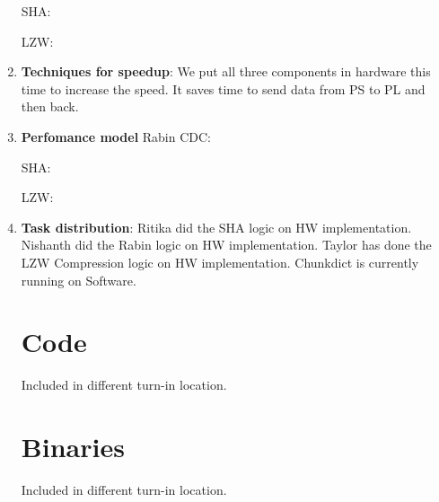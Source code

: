\documentclass{article}
\begin{document}
\begin{enumerate}
SHA:

LZW:
\newline

\item%
\textbf{Techniques for speedup}: We put all three components in hardware this time to increase the speed. It saves time to send data from PS to PL and then back. 
\newline


\item%
\textbf{Perfomance model}
Rabin CDC:


SHA:


LZW:
\newline


\item%
\textbf{Task distribution}: 
Ritika did the SHA logic on HW implementation. 
Nishanth did the Rabin logic on HW implementation.
Taylor has done the LZW Compression logic on HW implementation.
Chunkdict is currently running on Software. 
\newline

\section{Code}

Included in different turn-in location.

\section{Binaries}

Included in different turn-in location.


\begin{appendices}
%
%
%


\end{appendices}




\end{enumerate}
\end{document}
